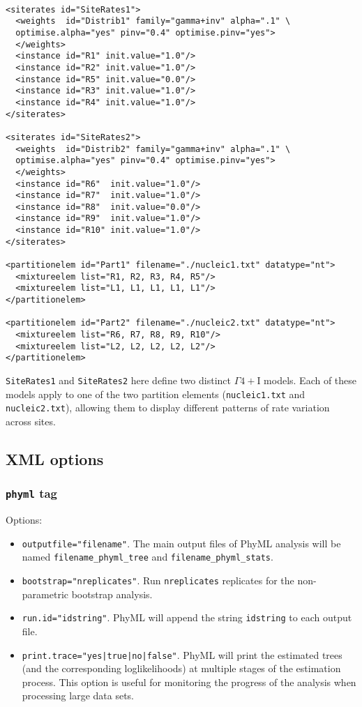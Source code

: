 \documentclass[a4paper,12pt]{article}
\newcommand{\x}[1]{\texttt{#1}}
\begin{document}
\vspace{0.2cm}
\begin{Verbatim}[frame=single, label=Two distinct $\Gamma4+$I models, samepage=true, baselinestretch=0.5]

<siterates id="SiteRates1">
  <weights  id="Distrib1" family="gamma+inv" alpha=".1" \
  optimise.alpha="yes" pinv="0.4" optimise.pinv="yes">
  </weights>
  <instance id="R1" init.value="1.0"/>
  <instance id="R2" init.value="1.0"/>
  <instance id="R5" init.value="0.0"/>
  <instance id="R3" init.value="1.0"/>
  <instance id="R4" init.value="1.0"/>
</siterates>

<siterates id="SiteRates2">
  <weights  id="Distrib2" family="gamma+inv" alpha=".1" \
  optimise.alpha="yes" pinv="0.4" optimise.pinv="yes">
  </weights>
  <instance id="R6"  init.value="1.0"/>
  <instance id="R7"  init.value="1.0"/>
  <instance id="R8"  init.value="0.0"/>
  <instance id="R9"  init.value="1.0"/>
  <instance id="R10" init.value="1.0"/>
</siterates>

<partitionelem id="Part1" filename="./nucleic1.txt" datatype="nt">
  <mixtureelem list="R1, R2, R3, R4, R5"/>
  <mixtureelem list="L1, L1, L1, L1, L1"/>
</partitionelem>

<partitionelem id="Part2" filename="./nucleic2.txt" datatype="nt">
  <mixtureelem list="R6, R7, R8, R9, R10"/>
  <mixtureelem list="L2, L2, L2, L2, L2"/>
</partitionelem>

\end{Verbatim}

\x{SiteRates1} and \x{SiteRates2} here define two distinct $\Gamma4+$I models. Each of these models apply to
one of the two partition elements (\x{nucleic1.txt} and \x{nucleic2.txt}), allowing them to display
different patterns of rate variation across sites.


\subsection{XML options}
\subsubsection{{\tt phyml} tag}
Options:
\begin{itemize}
\item \x{outputfile="filename"}. The main output files of PhyML analysis will be named
  \x{filename\_phyml\_tree} and \x{filename\_phyml\_stats}.
\item \x{bootstrap="nreplicates"}. Run \x{nreplicates} replicates for the non-parametric bootstrap analysis.
\item \x{run.id="idstring"}. PhyML will append the string \x{idstring} to each output file.
\item \x{print.trace="yes|true|no|false"}. PhyML will print the estimated trees (and the
  corresponding loglikelihoods) at multiple stages of the estimation process. This option is useful
  for monitoring the progress of the analysis when processing large data sets.

\end{itemize}
\end{document}
